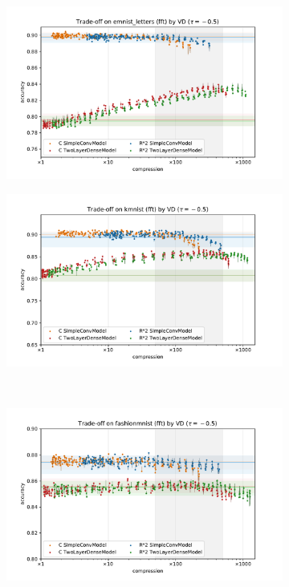 \documentclass[a4paper,10pt]{article}
\begin{document}
\begin{figure}[b]
  \centering
  \begin{subfigure}[b]{0.5\textwidth}
    \centering
    \includegraphics[width=\linewidth]{figure__mnist-like__trade-off/appendix__cmp__VD__emnist_letters__fft__-0.5.pdf}
  \end{subfigure}%
  \begin{subfigure}[b]{0.5\textwidth}
    \centering
    \includegraphics[width=\linewidth]{figure__mnist-like__trade-off/appendix__cmp__VD__kmnist__fft__-0.5.pdf}
  \end{subfigure} \\ %
  \begin{subfigure}[b]{0.5\textwidth}
    \centering
    \includegraphics[width=\linewidth]{figure__mnist-like__trade-off/appendix__cmp__VD__fashionmnist__fft__-0.5.pdf}

\end{subfigure}
\end{figure}
\end{document}
